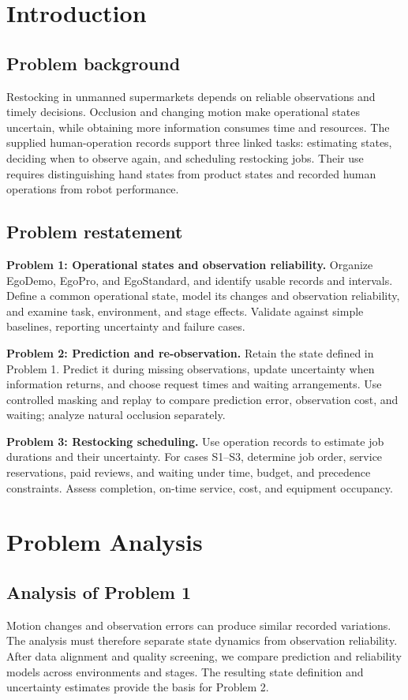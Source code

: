 \section{Introduction}
\subsection{Problem background}
Restocking in unmanned supermarkets depends on reliable observations and timely decisions. Occlusion and changing motion make operational states uncertain, while obtaining more information consumes time and resources. The supplied human-operation records support three linked tasks: estimating states, deciding when to observe again, and scheduling restocking jobs. Their use requires distinguishing hand states from product states and recorded human operations from robot performance.

\subsection{Problem restatement}
\noindent\textbf{Problem 1: Operational states and observation reliability.}
Organize EgoDemo, EgoPro, and EgoStandard, and identify usable records and intervals. Define a common operational state, model its changes and observation reliability, and examine task, environment, and stage effects. Validate against simple baselines, reporting uncertainty and failure cases.

\noindent\textbf{Problem 2: Prediction and re-observation.}
Retain the state defined in Problem 1. Predict it during missing observations, update uncertainty when information returns, and choose request times and waiting arrangements. Use controlled masking and replay to compare prediction error, observation cost, and waiting; analyze natural occlusion separately.

\noindent\textbf{Problem 3: Restocking scheduling.}
Use operation records to estimate job durations and their uncertainty. For cases S1--S3, determine job order, service reservations, paid reviews, and waiting under time, budget, and precedence constraints. Assess completion, on-time service, cost, and equipment occupancy.

\section{Problem Analysis}
\subsection{Analysis of Problem 1}
Motion changes and observation errors can produce similar recorded variations. The analysis must therefore separate state dynamics from observation reliability. After data alignment and quality screening, we compare prediction and reliability models across environments and stages. The resulting state definition and uncertainty estimates provide the basis for Problem 2.

